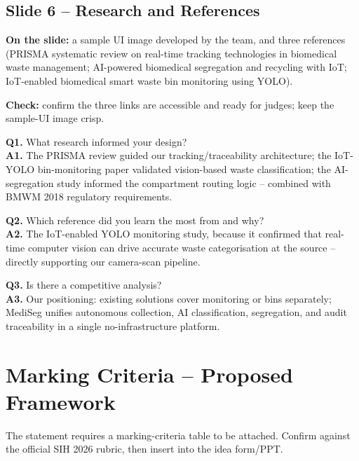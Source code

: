 \documentclass[11pt, a4paper]{article}
\begin{document}
\subsection{Slide 6 -- Research and References}
\textbf{On the slide:} a sample UI image developed by the team, and three
references (PRISMA systematic review on real-time tracking technologies in
biomedical waste management; AI-powered biomedical segregation and recycling
with IoT; IoT-enabled biomedical smart waste bin monitoring using YOLO).

\textbf{Check:} confirm the three links are accessible and ready for judges;
keep the sample-UI image crisp.

\begin{qabox}
\textbf{Q1.} What research informed your design?\\
\textbf{A1.} The PRISMA review guided our tracking/traceability architecture;
the IoT-YOLO bin-monitoring paper validated vision-based waste
classification; the AI-segregation study informed the compartment routing
logic -- combined with BMWM 2018 regulatory requirements.

\textbf{Q2.} Which reference did you learn the most from and why?\\
\textbf{A2.} The IoT-enabled YOLO monitoring study, because it confirmed that
real-time computer vision can drive accurate waste categorisation at the
source -- directly supporting our camera-scan pipeline.

\textbf{Q3.} Is there a competitive analysis?\\
\textbf{A3.} Our positioning: existing solutions cover monitoring or bins
separately; MediSeg unifies autonomous collection, AI classification,
segregation, and audit traceability in a single no-infrastructure platform.
\end{qabox}

\section{Marking Criteria -- Proposed Framework}

The statement requires a marking-criteria table to be attached. Confirm
against the official SIH 2026 rubric, then insert into the idea form/PPT.
\end{document}
